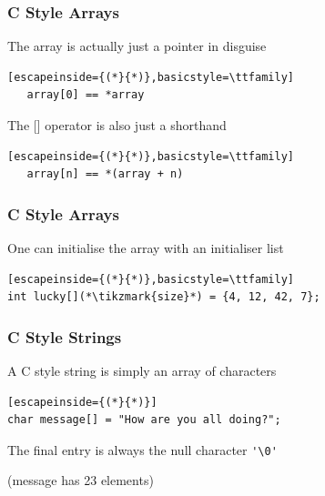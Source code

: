 \documentclass[14pt,a4paper,dvipsnames,usenames]{beamer}
\begin{document}
\begin{frame}[fragile]
  \frametitle{{\LARGE C} \hspace{.2em} Style Arrays}

  The array is actually just a pointer in disguise

  \begin{center}
    \begin{lstlisting}[escapeinside={(*}{*)},basicstyle=\ttfamily]
   array[0] == *array
    \end{lstlisting}
  \end{center}

  The {\large\color{Tropiteal} []} operator is also just a shorthand

  \begin{center}
    \begin{lstlisting}[escapeinside={(*}{*)},basicstyle=\ttfamily]
   array[n] == *(array + n)
    \end{lstlisting}
  \end{center}
  
\end{frame}

\begin{frame}[fragile]
  \frametitle{{\LARGE C} \hspace{.2em} Style Arrays}

  One can initialise the array with an initialiser list

  \vspace{.5cm}
  \begin{lstlisting}[escapeinside={(*}{*)},basicstyle=\ttfamily]
int lucky[](*\tikzmark{size}*) = {4, 12, 42, 7};
  \end{lstlisting}

  \nointerlineskip
  
\end{frame}

\begin{frame}[fragile]
  \frametitle{{\LARGE C} \hspace{.2em} Style Strings}

  A C style string is simply an array of characters

  \vspace{.5cm}
  \begin{lstlisting}[escapeinside={(*}{*)}]
char message[] = "How are you all doing?";
  \end{lstlisting}

  \vspace{.5cm}
  The final entry is always the null character \lstinline!'\0'!

  \vspace{.5cm}
  \footnotesize
  ({\color{Tropiteal}message} has 23 elements)
  
\end{frame}
\end{document}

